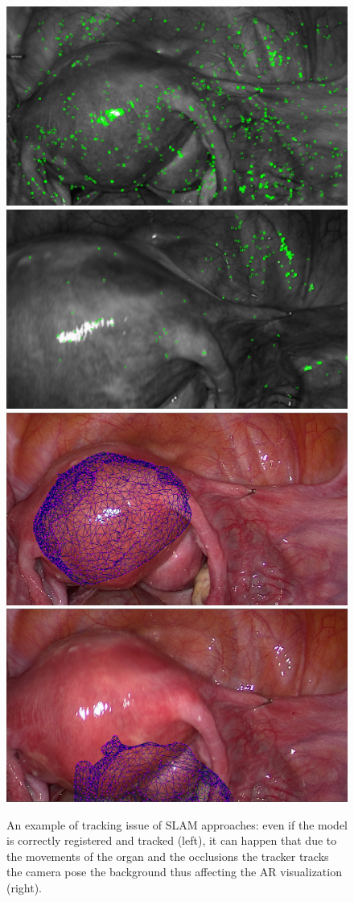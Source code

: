 \begin{figure}
  \centering
  \includegraphics[width=0.45\columnwidth]{./figs/frame0001Features.png}
  \includegraphics[width=0.45\columnwidth]{./figs/frame0107Features.png}
  \includegraphics[width=0.45\columnwidth]{./figs/frame001.png}
  \includegraphics[width=0.45\columnwidth]{./figs/frame107.png}  
\caption{An example of tracking issue of SLAM approaches: even if the model is correctly registered and tracked (left), it can happen that due to the movements of the organ and the occlusions the tracker tracks the camera pose \wrt the background thus affecting the AR visualization (right). }
\label{fig:orbAR}
\end{figure}


